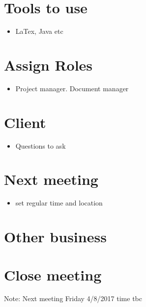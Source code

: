 \documentclass[11pt, a4paper]{article}
\begin{document}
\section{Tools to use}
\begin{itemize}
\item LaTex, Java etc
\end{itemize}

\section{Assign Roles}
\begin{itemize}
\item Project manager. Document manager
\end{itemize}

\section{Client}
\begin{itemize}
\item Questions to ask
\end{itemize}

\section{Next meeting}
\begin{itemize}
\item set regular time and location
\end{itemize}

\section{Other business}

\section {Close meeting}
\vspace*{10pt}
\noindent Note: Next meeting Friday 4/8/2017 time tbc
\end{document}
